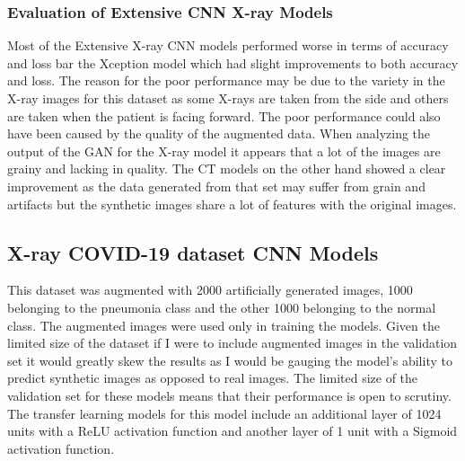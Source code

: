 \subsubsection{Evaluation of Extensive CNN X-ray Models}
Most of the Extensive X-ray CNN models performed worse in terms of accuracy and loss bar the Xception model which had slight improvements to both accuracy and loss.  The reason for the poor performance may be due to the variety in the X-ray images for this dataset as some X-rays are taken from the side and others are taken when the patient is facing forward. The poor performance could also have been caused by the quality of the augmented data.  When analyzing the output of the GAN for the X-ray model it appears that a lot of the images are grainy and lacking in quality.  The CT models on the other hand showed a clear improvement as the data generated from that set may suffer from grain and artifacts but the synthetic images share a lot of features with the original images.
\subsection{X-ray COVID-19 dataset CNN Models}
This dataset was augmented with 2000 artificially generated images, 1000 belonging to the pneumonia class and the other 1000 belonging to the normal class.  The augmented images were used only in training the models. Given the limited size of the dataset if I were to include augmented images in the validation set it would greatly skew the results as I would be gauging the model's ability to predict synthetic images as opposed to real images.  The limited size of the validation set for these models means that their performance is open to scrutiny.  The transfer learning models for this  model include an additional layer of 1024 units with a ReLU activation function and another layer of 1 unit with a Sigmoid activation function.

